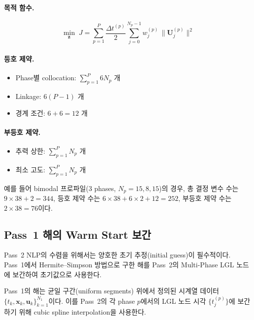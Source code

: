 \documentclass[11pt]{article}
\begin{document}
\paragraph{목적 함수.}
\[
\min_{\mathbf{z}} \; J = \sum_{p=1}^{P} \frac{\Delta t^{(p)}}{2} \sum_{j=0}^{N_p-1} w_j^{(p)} \, \|\mathbf{U}_j^{(p)}\|^2
\]

\paragraph{등호 제약.}
\begin{itemize}
  \item Phase별 collocation: $\sum_{p=1}^{P} 6 N_p$ 개
  \item Linkage: $6(P-1)$ 개
  \item 경계 조건: $6 + 6 = 12$ 개
\end{itemize}

\paragraph{부등호 제약.}
\begin{itemize}
  \item 추력 상한: $\sum_{p=1}^{P} N_p$ 개
  \item 최소 고도: $\sum_{p=1}^{P} N_p$ 개
\end{itemize}

예를 들어 bimodal 프로파일(3 phases, $N_p = 15, 8, 15$)의 경우, 총 결정 변수 수는 $9 \times 38 + 2 = 344$, 등호 제약 수는 $6 \times 38 + 6 \times 2 + 12 = 252$, 부등호 제약 수는 $2 \times 38 = 76$이다.


\subsection{Pass~1 해의 Warm Start 보간}
\label{sec:warm_start}

Pass~2 NLP의 수렴을 위해서는 양호한 초기 추정(initial guess)이 필수적이다.
Pass~1에서 Hermite--Simpson 방법으로 구한 해를 Pass~2의 Multi-Phase LGL 노드에 보간하여 초기값으로 사용한다.

Pass~1의 해는 균일 구간(uniform segments) 위에서 정의된 시계열 데이터 $\{t_k, \mathbf{x}_k, \mathbf{u}_k\}_{k=1}^{N_1}$이다.
이를 Pass~2의 각 phase $p$에서의 LGL 노드 시각 $\{t_j^{(p)}\}$에 보간하기 위해 cubic spline interpolation을 사용한다.
\end{document}
